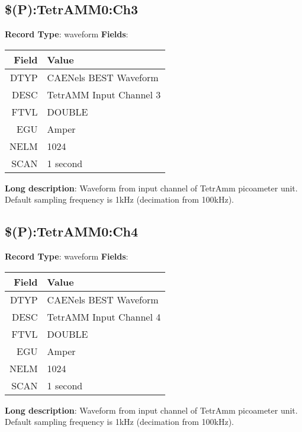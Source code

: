 \subsection{\$(P):TetrAMM0:Ch3}
\textbf{Record Type}: waveform \newline \newline 
\textbf{Fields}: \newline 
\begin{tabularx}{0.7\linewidth}{|r|X|}
\hline Field & Value \\
\hline
\hline
DTYP & CAENels BEST Waveform\\
\hline
DESC & TetrAMM Input Channel 3\\
\hline
FTVL & DOUBLE\\
\hline
EGU & Amper\\
\hline
NELM & 1024\\
\hline
SCAN & 1 second\\
\hline
\end{tabularx}
\newline \newline \newline
\textbf{Long description}: \newline 
 Waveform from input channel of TetrAmm picoameter unit. Default sampling frequency is 1kHz (decimation from 100kHz).
\newline \newline


\subsection{\$(P):TetrAMM0:Ch4}
\textbf{Record Type}: waveform \newline \newline 
\textbf{Fields}: \newline 
\begin{tabularx}{0.7\linewidth}{|r|X|}
\hline Field & Value \\
\hline
\hline
DTYP & CAENels BEST Waveform\\
\hline
DESC & TetrAMM Input Channel 4\\
\hline
FTVL & DOUBLE\\
\hline
EGU & Amper\\
\hline
NELM & 1024\\
\hline
SCAN & 1 second\\
\hline
\end{tabularx}
\newline \newline \newline
\textbf{Long description}: \newline 
 Waveform from input channel of TetrAmm picoameter unit. Default sampling frequency is 1kHz (decimation from 100kHz).
\newline \newline


